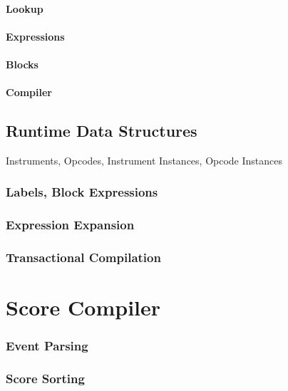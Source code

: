 \documentclass[]{book}
\begin{document}
\subsubsection{Lookup}

\subsubsection{Expressions}

\subsubsection{Blocks}

\subsubsection{Compiler}

\section{Runtime Data Structures}

Instruments, Opcodes, Instrument Instances, Opcode Instances

\subsection{Labels, Block Expressions}

\subsection{Expression Expansion}

\subsection{Transactional Compilation}


\chapter{Score Compiler}

\subsection{Event Parsing}

\subsection{Score Sorting}
\end{document}
